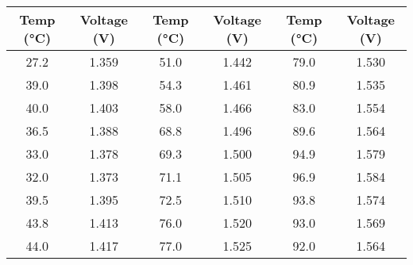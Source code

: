 \begin{tabular}{cc|cc|cc}
	\toprule
	\textbf{Temp (°C)} & \textbf{Voltage (V)} & \textbf{Temp (°C)} & \textbf{Voltage (V)} & \textbf{Temp (°C)} & \textbf{Voltage (V)} \\
	\midrule
	27.2 & 1.359 & 51.0 & 1.442 & 79.0 & 1.530 \\
	39.0 & 1.398 & 54.3 & 1.461 & 80.9 & 1.535 \\
	40.0 & 1.403 & 58.0 & 1.466 & 83.0 & 1.554 \\
	36.5 & 1.388 & 68.8 & 1.496 & 89.6 & 1.564 \\
	33.0 & 1.378 & 69.3 & 1.500 & 94.9 & 1.579 \\
	32.0 & 1.373 & 71.1 & 1.505 & 96.9 & 1.584 \\
	39.5 & 1.395 & 72.5 & 1.510 & 93.8 & 1.574 \\
	43.8 & 1.413 & 76.0 & 1.520 & 93.0 & 1.569 \\
	44.0 & 1.417 & 77.0 & 1.525 & 92.0 & 1.564 \\
	\bottomrule
\end{tabular}